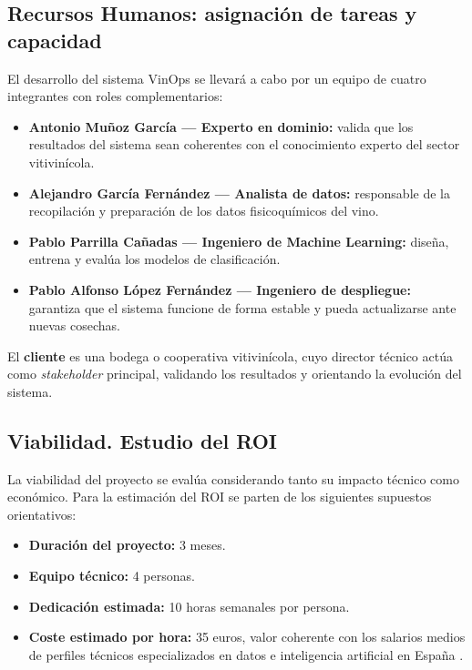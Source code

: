 \subsection{Recursos Humanos: asignación de tareas y capacidad}

El desarrollo del sistema VinOps se llevará a cabo por un equipo de cuatro integrantes 
con roles complementarios:

\begin{itemize}
    \item \textbf{Antonio Muñoz García — Experto en dominio:} valida que los 
    resultados del sistema sean coherentes con el conocimiento 
    experto del sector vitivinícola.
    
    \item \textbf{Alejandro García Fernández — Analista de datos:} responsable de 
    la recopilación y preparación de los datos fisicoquímicos 
    del vino.
    
    \item \textbf{Pablo Parrilla Cañadas — Ingeniero de Machine Learning:} 
    diseña, entrena y evalúa los modelos de clasificación.
    
    \item \textbf{Pablo Alfonso López Fernández — Ingeniero de despliegue:} garantiza 
    que el sistema funcione de forma estable y pueda actualizarse 
    ante nuevas cosechas.
\end{itemize}

El \textbf{cliente} es una bodega o cooperativa vitivinícola, cuyo director técnico actúa 
como \textit{stakeholder} principal, validando los resultados y orientando la evolución 
del sistema.


\subsection{Viabilidad. Estudio del ROI}

La viabilidad del proyecto se evalúa considerando tanto su impacto 
técnico como económico. Para la estimación del ROI se parten de los 
siguientes supuestos orientativos:

\begin{itemize}
    \item \textbf{Duración del proyecto:} 3 meses.
    \item \textbf{Equipo técnico:} 4 personas.
    \item \textbf{Dedicación estimada:} 10 horas semanales por persona.
    \item \textbf{Coste estimado por hora:} 35 euros, valor coherente 
    con los salarios medios de perfiles técnicos especializados en 
    datos e inteligencia artificial en España \cite{Glassdoor2024}.
\end{itemize}

